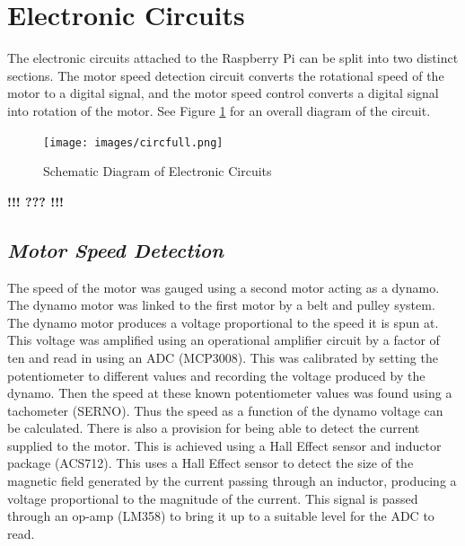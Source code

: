 \documentclass[twoside,a4]{report}
\def\br{\newline \newline \noindent}
\def\cbh{\large\bfseries !!! ??? !!! \normalsize\normalfont}
\begin{document}
	\section{Electronic Circuits} %
	The electronic circuits attached to the Raspberry Pi can be split into two distinct sections. The motor speed detection circuit converts the rotational speed of the motor to a digital signal, and the motor speed control converts a digital signal into rotation of the motor. See Figure \ref{circfull} for an overall diagram of the circuit.
	\begin{figure}[!htb]
		\centering
		\texttt{[image: images/circfull.png]}
		\caption{Schematic Diagram of Electronic Circuits}
		\label{circfull}
	\end{figure}
	\cbh %

	\subsection*{\textit{Motor Speed Detection}} %
	The speed of the motor was gauged using a second motor acting as a dynamo. The dynamo motor was linked to the first motor by a belt and pulley system. The dynamo motor produces a voltage proportional to the speed it is spun at. This voltage was amplified using an operational amplifier circuit by a factor of ten and read in using an ADC (MCP3008). This was calibrated by setting the potentiometer to different values and recording the voltage produced by the dynamo. Then the speed at these known potentiometer values was found using a tachometer (SERNO). Thus the speed as a function of the dynamo voltage can be calculated. \br
	There is also a provision for being able to detect the current supplied to the motor. This is achieved using a Hall Effect sensor and inductor package (ACS712). This uses a Hall Effect sensor to detect the size of the magnetic field generated by the current passing through an inductor, producing a voltage proportional to the magnitude of the current. This signal is passed through an op-amp (LM358) to bring it up to a suitable level for the ADC to read.
	
\end{document}
